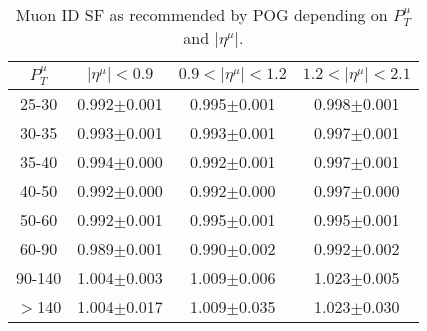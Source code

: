 \begin{table}[h]
  \footnotesize
  \begin{center}
  \caption{Muon ID SF as recommended by POG depending on $P_T^{\mu}$ and $|\eta^{\mu}|$.} 
   \begin{tabular}{|c|c|c|c|}
 $P_T^{\mu}$  & $|\eta^{\mu}|< 0.9$   & $0.9<|\eta^{\mu}|< 1.2$    & $1.2<|\eta^{\mu}|< 2.1$ \\ \hline
25-30          & 0.992$\pm$0.001   & 0.995$\pm$0.001    & 0.998$\pm$0.001     \\ \hline
30-35          & 0.993$\pm$0.001   & 0.993$\pm$0.001    & 0.997$\pm$0.001        \\ \hline
35-40          & 0.994$\pm$0.000   & 0.992$\pm$0.001    & 0.997$\pm$0.001        \\ \hline
40-50          & 0.992$\pm$0.000   & 0.992$\pm$0.000    & 0.997$\pm$0.000        \\ \hline
50-60          & 0.992$\pm$0.001   & 0.995$\pm$0.001    & 0.995$\pm$0.001        \\ \hline
60-90          & 0.989$\pm$0.001   & 0.990$\pm$0.002    & 0.992$\pm$0.002        \\ \hline
90-140         & 1.004$\pm$0.003   & 1.009$\pm$0.006    & 1.023$\pm$0.005        \\ \hline
$>$140         & 1.004$\pm$0.017   & 1.009$\pm$0.035    & 1.023$\pm$0.030        \\ \hline
  \end{tabular}
  \label{tab:SFs_MuonID}
  \end{center}
\end{table}

